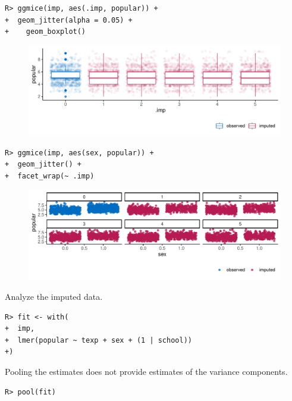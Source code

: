 \documentclass[
  article]{jss}
\begin{document}
\begin{verbatim}
R> ggmice(imp, aes(.imp, popular)) + 
+  geom_jitter(alpha = 0.05) +
+    geom_boxplot()
\end{verbatim}

\begin{figure}[h]

{\centering \includegraphics{manuscript_files/figure-pdf/unnamed-chunk-21-1.pdf}

}

\end{figure}

\begin{verbatim}
R> ggmice(imp, aes(sex, popular)) +
+  geom_jitter() +
+  facet_wrap(~ .imp)
\end{verbatim}

\begin{figure}[h]

{\centering \includegraphics{manuscript_files/figure-pdf/unnamed-chunk-22-1.pdf}

}

\end{figure}

Analyze the imputed data.

\begin{verbatim}
R> fit <- with(
+  imp,
+  lmer(popular ~ texp + sex + (1 | school))
+)
\end{verbatim}

Pooling the estimates does not provide estimates of the variance
components.

\begin{verbatim}
R> pool(fit)
\end{verbatim}
\end{document}

